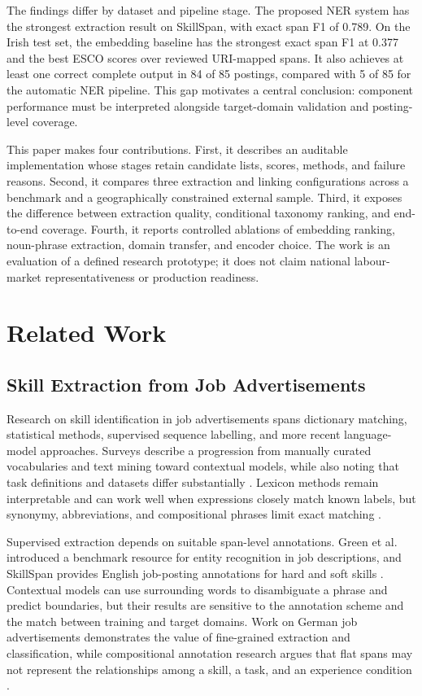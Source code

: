 \documentclass[conference]{IEEEtran}
\begin{document}
The findings differ by dataset and pipeline stage. The proposed NER system has the strongest extraction result on SkillSpan, with exact span F1 of 0.789. On the Irish test set, the embedding baseline has the strongest exact span F1 at 0.377 and the best ESCO scores over reviewed URI-mapped spans. It also achieves at least one correct complete output in 84 of 85 postings, compared with 5 of 85 for the automatic NER pipeline. This gap motivates a central conclusion: component performance must be interpreted alongside target-domain validation and posting-level coverage.

This paper makes four contributions. First, it describes an auditable implementation whose stages retain candidate lists, scores, methods, and failure reasons. Second, it compares three extraction and linking configurations across a benchmark and a geographically constrained external sample. Third, it exposes the difference between extraction quality, conditional taxonomy ranking, and end-to-end coverage. Fourth, it reports controlled ablations of embedding ranking, noun-phrase extraction, domain transfer, and encoder choice. The work is an evaluation of a defined research prototype; it does not claim national labour-market representativeness or production readiness.

\section{Related Work}
\subsection{Skill Extraction from Job Advertisements}
Research on skill identification in job advertisements spans dictionary matching, statistical methods, supervised sequence labelling, and more recent language-model approaches. Surveys describe a progression from manually curated vocabularies and text mining toward contextual models, while also noting that task definitions and datasets differ substantially \cite{Khaouja2021,Rahhal2024,Senger2024}. Lexicon methods remain interpretable and can work well when expressions closely match known labels, but synonymy, abbreviations, and compositional phrases limit exact matching \cite{Napierala2024,Ao2023}.

Supervised extraction depends on suitable span-level annotations. Green et al. introduced a benchmark resource for entity recognition in job descriptions, and SkillSpan provides English job-posting annotations for hard and soft skills \cite{Green2022,SkillSpan2022}. Contextual models can use surrounding words to disambiguate a phrase and predict boundaries, but their results are sensitive to the annotation scheme and the match between training and target domains. Work on German job advertisements demonstrates the value of fine-grained extraction and classification, while compositional annotation research argues that flat spans may not represent the relationships among a skill, a task, and an experience condition \cite{Gnehm2022,Kruger2025}.
\end{document}

